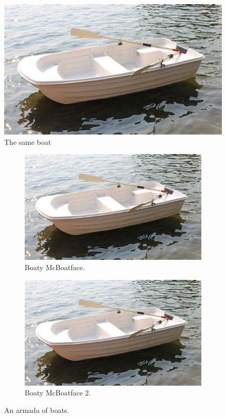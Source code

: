 \documentclass{article}
\begin{document}
  \begin{figure}[h!]
    \includegraphics[width=\linewidth]{boat.jpeg}
    \caption{The same boat}
    \label{fig:boat2}
  \end{figure}

  \begin{figure}[b]
    \centering
    \begin{subfigure}[b]{0.4\linewidth}
      \includegraphics[width=\linewidth]{boat.jpeg}
      \caption{Boaty McBoatface.}
    \end{subfigure}
    \begin{subfigure}[b]{0.4\linewidth}
      \includegraphics[width=\linewidth]{boat.jpeg}
      \caption{Boaty McBoatface 2.}
    \end{subfigure}
    \caption{An armada of boats.}
    \label{fig:boats}
  \end{figure}
\end{document}
